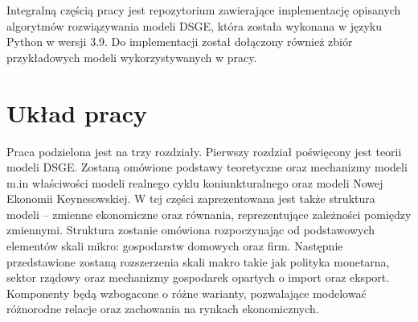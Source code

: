 Integralną częścią pracy jest repozytorium zawierające implementację opisanych algorytmów rozwiązywania modeli DSGE, która została wykonana w języku Python w wersji 3.9. Do implementacji został dołączony również zbiór przykładowych modeli wykorzystywanych w pracy.

\section*{Układ pracy}

Praca podzielona jest na trzy rozdziały. Pierwszy rozdział poświęcony jest teorii modeli DSGE. Zostaną omówione podstawy teoretyczne oraz mechanizmy modeli m.in właściwości modeli realnego cyklu koniunkturalnego oraz modeli Nowej Ekonomii Keynesowskiej. W tej części zaprezentowana jest także struktura modeli -- zmienne ekonomiczne oraz równania, reprezentujące zależności pomiędzy zmiennymi. Struktura zostanie omówiona rozpoczynając od podstawowych elementów skali mikro: gospodarstw domowych oraz firm. Następnie przedstawione zostaną rozszerzenia skali makro takie jak polityka monetarna, sektor rządowy oraz mechanizmy gospodarek opartych o import oraz eksport. Komponenty będą wzbogacone o różne warianty, pozwalające modelować różnorodne relacje oraz zachowania na rynkach ekonomicznych. 


